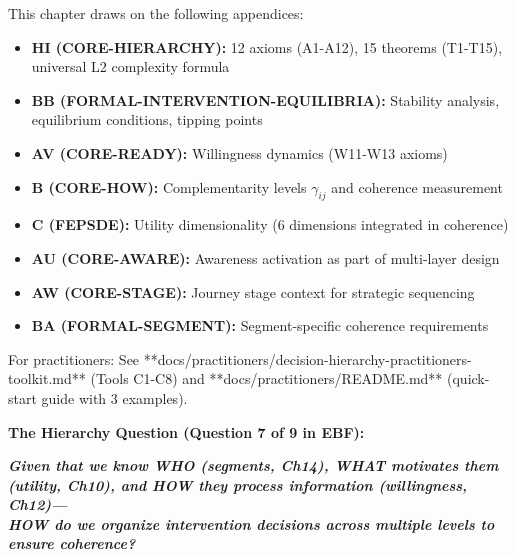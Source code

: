 \documentclass[11pt, a4paper]{article}
\begin{document}
\begin{tcolorbox}[colback=yellow!10!white, colframe=orange!75!black, title=Appendix References for This Chapter]
This chapter draws on the following appendices:

\begin{itemize}[nosep]
    \item \textbf{HI (CORE-HIERARCHY):} 12 axioms (A1-A12), 15 theorems (T1-T15), universal L2 complexity formula
    \item \textbf{BB (FORMAL-INTERVENTION-EQUILIBRIA):} Stability analysis, equilibrium conditions, tipping points
    \item \textbf{AV (CORE-READY):} Willingness dynamics (W11-W13 axioms)
    \item \textbf{B (CORE-HOW):} Complementarity levels $\gamma_{ij}$ and coherence measurement
    \item \textbf{C (FEPSDE):} Utility dimensionality (6 dimensions integrated in coherence)
    \item \textbf{AU (CORE-AWARE):} Awareness activation as part of multi-layer design
    \item \textbf{AW (CORE-STAGE):} Journey stage context for strategic sequencing
    \item \textbf{BA (FORMAL-SEGMENT):} Segment-specific coherence requirements
\end{itemize}

For practitioners: See **docs/practitioners/decision-hierarchy-practitioners-toolkit.md** (Tools C1-C8) and **docs/practitioners/README.md** (quick-start guide with 3 examples).
\end{tcolorbox}


\begin{tcolorbox}[colback=red!10!white, colframe=red!75!black, title=Central Question of Chapter 15]
\textbf{The Hierarchy Question (Question 7 of 9 in EBF):}

\Large\textbf{\textit{Given that we know WHO (segments, Ch14), WHAT motivates them (utility, Ch10), and HOW they process information (willingness, Ch12)---\\[8pt]HOW do we organize intervention decisions across multiple levels to ensure coherence?}}

\end{tcolorbox}
\end{document}
